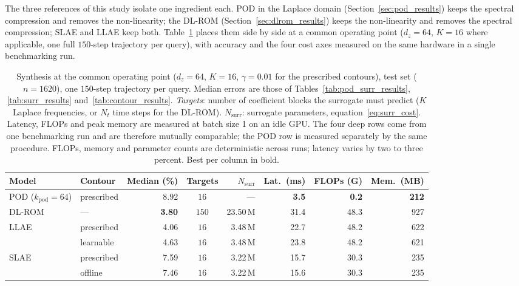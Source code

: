 ﻿\documentclass[a4paper,12pt]{article}
\theoremstyle{definition}
\theoremstyle{remark}
\begin{document}
The three references of this study isolate one ingredient each. POD in the Laplace domain (Section~\ref{sec:pod_results}) keeps the spectral compression and removes the non-linearity; the DL-ROM (Section~\ref{sec:dlrom_results}) keeps the non-linearity and removes the spectral compression; SLAE and LLAE keep both. Table~\ref{tab:synthesis} places them side by side at a common operating point ($d_z = 64$, $K = 16$ where applicable, one full $150$-step trajectory per query), with accuracy and the four cost axes measured on the same hardware in a single benchmarking run.

\begin{table}[htbp]
    \centering
    \small
    \setlength{\tabcolsep}{2pt}
    \renewcommand{\arraystretch}{1.3}
    \begin{tabular}{llrcrrrr}
        \toprule
        \textbf{Model} & \textbf{Contour} & \textbf{Median (\%)}
            & \textbf{Targets} & $N_{\mathrm{surr}}$ & \textbf{Lat.\ (ms)}
            & \textbf{FLOPs (G)} & \textbf{Mem.\ (MB)} \\
        \midrule
        POD ($k_{\mathrm{pod}}=64$) & prescribed & 8.92 & $16$  & ---     & \textbf{3.5} & \textbf{0.2}  & \textbf{212} \\
        \midrule
        DL-ROM                      & ---        & \textbf{3.80} & $150$ & 23.50\,M & 31.4 & 48.3 & 927 \\
        \midrule
        \multirow{2}{*}{LLAE}
          & prescribed & 4.06 & $16$ & 3.48\,M & 22.7 & 48.2 & 622 \\
          & learnable  & 4.63 & $16$ & 3.48\,M & 23.8 & 48.2 & 621 \\
        \midrule
        \multirow{2}{*}{SLAE}
          & prescribed & 7.59 & $16$ & 3.22\,M & 15.7 & 30.3 & 235 \\
          & offline    & 7.46 & $16$ & 3.22\,M & 15.6 & 30.3 & 235 \\
        \bottomrule
    \end{tabular}
    \caption{Synthesis at the common operating point ($d_z = 64$, $K = 16$, $\gamma = 0.01$ for the prescribed contours), test set ($n = 1620$), one $150$-step trajectory per query. Median errors are those of Tables~\ref{tab:pod_surr_results}, \ref{tab:surr_results} and~\ref{tab:contour_results}. \emph{Targets}: number of coefficient blocks the surrogate must predict ($K$ Laplace frequencies, or $N_t$ time steps for the DL-ROM). $N_{\mathrm{surr}}$: surrogate parameters, equation~\eqref{eq:surr_cost}. Latency, FLOPs and peak memory are measured at batch size 1 on an idle GPU. The four deep rows come from one benchmarking run and are therefore mutually comparable; the POD row is measured separately by the same procedure. FLOPs, memory and parameter counts are deterministic across runs; latency varies by two to three percent. Best per column in bold.}
    \label{tab:synthesis}
\end{table}
\end{document}
